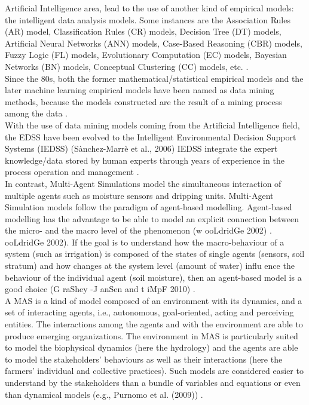 \documentclass[letterpaper, 10 pt, conference]{ieeeconf}  %
\begin{document}
Artificial Intelligence area, lead to the use of another kind of empirical models: the intelligent data analysis models. Some instances are the Association Rules (AR) model, Classification Rules (CR) models, Decision Tree (DT) models, Artificial Neural Networks (ANN) models, Case-Based Reasoning (CBR) models, Fuzzy Logic (FL) models, Evolutionary Computation (EC) models, Bayesian Networks (BN) models, Conceptual Clustering (CC) models, etc. \cite{S`anchez-Marr`e2014}.\\

Since the 80s, both the former mathematical/statistical empirical models and the later machine learning empirical models have been named as data mining methods, because the models constructed are the result of a mining process among the data  \cite{S`anchez-Marr`e2014}.\\


With the use of data mining models coming from the Artificial Intelligence field, the EDSS have been evolved to the Intelligent Environmental Decision Support Systems (IEDSS) (Sànchez-Marrè et al., 2006)
IEDSS integrate the expert knowledge/data stored by human experts through years of experience in the process operation and management  \cite{S`anchez-Marr`e2014}.\\

In contrast, Multi-Agent Simulations model the simultaneous interaction of multiple agents such as moisture sensors and dripping units. Multi-Agent Simulation models follow the paradigm of agent-based modelling. Agent-based modelling has the advantage to be able to model an explicit connection between the micro- and the macro level of the phenomenon (w ooLdridGe 2002) \cite{Grashey-Jansen2014}.\\

ooLdridGe 2002). If the goal is to understand how the macro-behaviour of a system (such as irrigation) is composed of the states of single agents (sensors, soil stratum) and how changes at the system level (amount of water) influ ence the behaviour of the individual agent (soil moisture), then an agent-based model is a good choice (G raShey -J anSen and t iMpF 2010) \cite{Grashey-Jansen2014}.\\


A MAS is a kind of model composed of an environment with its dynamics, and a set of interacting agents, i.e., autonomous, goal-oriented, acting and perceiving entities. The interactions among the agents and with the environment are able to produce emerging organizations. The environment in MAS is particularly suited to model the biophysical dynamics (here the hydrology) and the agents are able to model the stakeholders’ behaviours as well as their interactions (here the farmers’ individual and collective practices). Such models are considered easier to understand by the stakeholders than a bundle of variables and equations or even than dynamical models (e.g., Purnomo et al. (2009)) \cite{Farolfi2010}.
\end{document}
